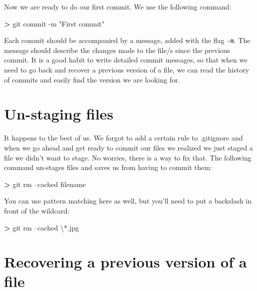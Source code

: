 \documentclass[
]{book}
\newenvironment{Shaded}{\begin{snugshade}}{\end{snugshade}}
\newcommand{\DataTypeTok}[1]{\textcolor[rgb]{0.13,0.29,0.53}{#1}}
\newcommand{\FunctionTok}[1]{\textcolor[rgb]{0.00,0.00,0.00}{#1}}
\newcommand{\NormalTok}[1]{#1}
\newcommand{\OperatorTok}[1]{\textcolor[rgb]{0.81,0.36,0.00}{\textbf{#1}}}
\newcommand{\StringTok}[1]{\textcolor[rgb]{0.31,0.60,0.02}{#1}}
\begin{document}
Now we are ready to do our first commit. We use the following command:

\begin{Shaded}
\begin{Highlighting}[]
\OperatorTok{>} \FunctionTok{git}\NormalTok{ commit -m }\StringTok{"First commit"}
\end{Highlighting}
\end{Shaded}

Each commit should be accompanied by a message, added with the flag \texttt{-m}. The message should describe the changes made to the file/s since the previous commit. It is a good habit to write detailed commit messages, so that when we need to go back and recover a previous version of a file, we can read the history of commits and easily find the version we are looking for.

\hypertarget{un-staging-files}{%
\section{Un-staging files}\label{un-staging-files}}

It happens to the best of us. We forgot to add a certain rule to .gitignore and when we go ahead and get ready to commit our files we realized we just staged a file we didn't want to stage. No worries, there is a way to fix that. The following command un-stages files and saves us from having to commit them:

\begin{Shaded}
\begin{Highlighting}[]
\OperatorTok{>} \FunctionTok{git}\NormalTok{ rm --cached filename}
\end{Highlighting}
\end{Shaded}

You can use pattern matching here as well, but you'll need to put a backslash in front of the wildcard:

\begin{Shaded}
\begin{Highlighting}[]
\OperatorTok{>} \FunctionTok{git}\NormalTok{ rm --cached }\DataTypeTok{\textbackslash{}*}\NormalTok{.jpg}
\end{Highlighting}
\end{Shaded}

\hypertarget{recovering-a-previous-version-of-a-file}{%
\section{Recovering a previous version of a file}\label{recovering-a-previous-version-of-a-file}}
\end{document}
